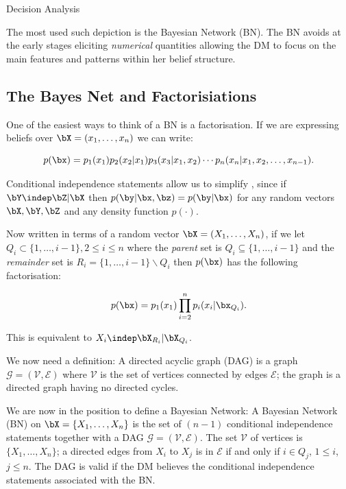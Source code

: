 \begin{chapter}{Decision Analysis \label{Ch:decision}}
\begin{itemize}
\end{itemize}

The most used such depiction is the Bayesian Network (BN). The BN avoids at the early stages eliciting \textit{numerical} quantities allowing the DM to focus on the main features and patterns within her belief structure.

\subsection{The Bayes Net and Factorisiations}

One of the easiest ways to think of a BN is a factorisation. If we are expressing beliefs over $\bX = (x_1, \ldots, x_n)$ we can write:

\begin{equation}
	p(\bx) = p_1(x_1)p_2(x_2|x_1)p_3(x_3|x_1, x_2) \cdots p_n(x_n|x_1, x_2, \ldots, x_{n-1}). \label{Eq:cond-mass}
\end{equation}

Conditional independence statements allow us to simplify , since if $\bY \indep \bZ | \bX$ then $p(\by | \bx, \bz) = p(\by | \bx)$ for any random vectors $\bX, \bY, \bZ$ and any density function $p(\cdot)$.

Now written in terms of a random vector $\bX = (X_1, \ldots, X_n)$, if we let $Q_i \subset \{1, \ldots, i-1\}, 2 \leq i \leq n $ where the \textit{parent} set is $Q_i \subseteq \{1, \ldots, i-1\}$ and the \textit{remainder} set is $R_i = \{1, \ldots, i-1\} \backslash  Q_i$ then $p(\bx)$ has the following factorisation:

\begin{equation}
	p(\bx) = p_1(x_1) \prod_{i=2}^n p_i(x_i | \bx_{Q_i}).
\end{equation}

This is equivalent to $X_i \indep \bX_{R_i} | \bX_{Q_i}$.

We now need a definition: A directed acyclic graph (DAG) is a graph $\mathcal{G} = (\mathcal{V}, \mathcal{E})$ where $\mathcal{V}$ is the set of vertices connected by edges $\mathcal{E}$; the graph is a directed graph having no directed cycles.

We  are now in the position to define a Bayesian Network:
A Bayesian Network (BN) on $\bX = \{X_1, \ldots, X_n\}$ is the set of $(n-1)$ conditional independence statements together with a DAG $\mathcal{G} = (\mathcal{V}, \mathcal{E})$. The set $\mathcal{V}$ of vertices is $\{X_1, \ldots, X_n\}$; a directed edges from $X_i$ to $X_j$ is in $\mathcal{E}$ if and only if $i \in Q_j$, $1\leq i$, $j \leq n$. The DAG is valid if the DM believes the conditional independence statements associated with the BN.


\end{chapter}

